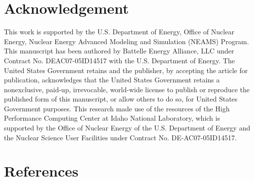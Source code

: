 \documentclass[review]{elsarticle}
\begin{document}
\section{Acknowledgement}
This work is supported by the U.S. Department of Energy, Office of Nuclear Energy, Nuclear Energy Advanced Modeling and Simulation (NEAMS) Program. This manuscript has been authored by Battelle Energy Alliance, LLC under Contract No. DEAC07-05ID14517 with the U.S. Department of Energy. The United States Government retains and the publisher, by accepting the article for publication, acknowledges that the United States Government retains a nonexclusive, paid-up, irrevocable, world-wide license to publish or reproduce the published form of this manuscript, or allow others to do so, for United States Government purposes. This research made use of the resources of the High Performance Computing Center at Idaho National Laboratory, which is supported by the Office of Nuclear Energy of the U.S. Department of Energy and the Nuclear Science User Facilities under Contract No. DE-AC07-05ID14517.



\section{References}


\end{document}
